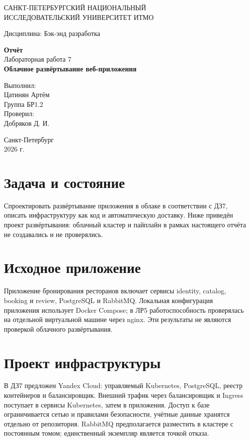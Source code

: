 \documentclass[14pt,a4paper]{extarticle}
\begin{document}
\begin{titlepage}\begin{center}
САНКТ-ПЕТЕРБУРГСКИЙ НАЦИОНАЛЬНЫЙ\\ ИССЛЕДОВАТЕЛЬСКИЙ УНИВЕРСИТЕТ ИТМО
\vspace{1.5cm}

Дисциплина: Бэк-энд разработка
\vspace{1.5cm}

\textbf{Отчёт}\\[0.5cm]
Лабораторная работа 7\\[0.5cm]
\textbf{Облачное развёртывание веб-приложения}
\vfill
\begin{flushright}Выполнил:\\ Цатинян Артём\\ Группа БР1.2\\[0.8cm] Проверил:\\ Добряков Д. И.\end{flushright}
\vfill Санкт-Петербург\\ 2026 г.\end{center}\end{titlepage}
\section{Задача и состояние}
Спроектировать развёртывание приложения в облаке в соответствии с ДЗ7, описать инфраструктуру как код и автоматическую доставку. Ниже приведён проект развёртывания: облачный кластер и пайплайн в рамках настоящего отчёта не создавались и не проверялись.
\section{Исходное приложение}
Приложение бронирования ресторанов включает сервисы identity, catalog, booking и review, PostgreSQL и RabbitMQ. Локальная конфигурация приложения использует Docker Compose; в ЛР5 работоспособность проверялась на отдельной виртуальной машине через nginx. Эти результаты не являются проверкой облачного развёртывания.
\section{Проект инфраструктуры}
В ДЗ7 предложен Yandex Cloud: управляемый Kubernetes, PostgreSQL, реестр контейнеров и балансировщик. Внешний трафик через балансировщик и Ingress поступает в сервисы Kubernetes, затем в приложения. Доступ к базе ограничивается сетью и правилами безопасности, учётные данные хранятся отдельно от репозитория. RabbitMQ предполагается разместить в кластере с постоянным томом; единственный экземпляр является точкой отказа.
\end{document}
